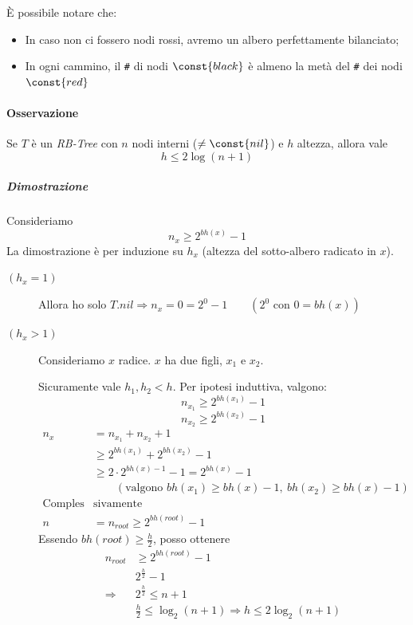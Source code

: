 È possibile notare che: 
\begin{itemize}
    \item In caso non ci fossero nodi rossi, avremo un albero
    perfettamente bilanciato;
    \item In ogni cammino, il \verb|#| di nodi $\const{black}$ è almeno la
    metà del \verb|#| dei nodi $\const{red}$
\end{itemize}

\paragraph{Osservazione} Se $T$ è un \emph{RB-Tree} con $n$ nodi interni ($\neq \const{nil}$)
e $h$ altezza, allora vale
$$h \leq 2 \log (n + 1)$$

\subparagraph{Dimostrazione} Consideriamo 
$$n_x \geq 2^{bh(x)} - 1$$
La dimostrazione è per induzione su $h_x$ (altezza del sotto-albero radicato in $x$).

\begin{description}
    \item[$(h_x = 1)$] Allora ho solo 
    $T.nil \Rightarrow n_x = 0 = 2^0 - 1 \qquad (2^0 \text{ con } 0 = bh(x))$
    \item[$(h_x > 1)$] Consideriamo $x$ radice. $x$ ha due figli, $x_1$ e $x_2$.\par
    Sicuramente vale $h_1,h_2 < h$. Per ipotesi induttiva, valgono:
    $$n_{x_1} \geq 2^{bh(x_1)} - 1$$
    $$n_{x_2} \geq 2^{bh(x_2)} - 1$$
    \begin{align*}
        n_x & = n_{x_1} + n_{x_2} + 1 \\
        & \geq 2^{bh(x_1)} + 2^{bh(x_2)} - 1 \\
        & \geq 2 \cdot 2^{bh(x)-1} - 1 = 2^{bh(x)} - 1 \\
        & \qquad (\text{valgono } bh(x_1) \geq bh(x)-1, \ bh(x_2) \geq bh(x)-1) \\
        \text{Comples}&\text{sivamente}\\
        n & = n_{root} \geq 2^{bh(root)} - 1
    \end{align*}
    Essendo $bh(root) \geq \frac{h}{2}$, posso ottenere
    \begin{align*}
        n_{root} & \geq 2^{bh(root)} - 1 \\
        & 2^{\frac{h}{2}} - 1 \\
        \Rightarrow \ & 2^{\frac{h}{2}} \leq n + 1 \\
        & \frac{h}{2} \leq \log_2(n+1) \Rightarrow h \leq 2 \log_2(n+1) 
    \end{align*}
\end{description}

